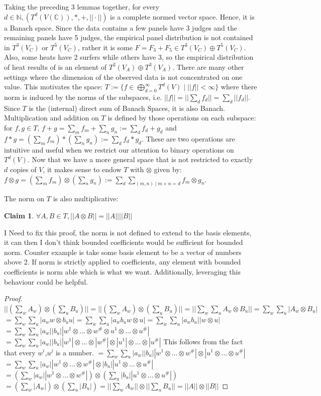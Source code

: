 \documentclass{article}
\newtheorem*{claim}{Claim}
\begin{document}
Taking the preceding 3 lemmas together, for every $d\in\mathbb{N},  (T^d(V(\mathbb{C})), *, +, ||\cdot||)$ is a complete normed vector space. Hence, it is a Banach space. Since the data contains a few panels have 3 judges and the remaining panels have 5 judges, the empirical panel distribution is not contained in $T^3(V_C)$ or $T^5(V_C)$, rather it is some $F = F_3 + F_5 \in T^3(V_C)\oplus T^5(V_C)$. Also, some heats have 2 surfers while others have 3, so the empirical distribution of heat results of is an element of $T^2(V_A)\oplus T^3(V_A)$. There are many other settings where the dimension of the observed data is not concentrated on one value. This motivates the space: $T := \{ f\in\bigoplus_{d=0}^\infty T^d(V) \mid ||f||<\infty \} $ where there norm is induced by the norms of the subspaces, i.e. $||f|| = ||\sum_d f_d|| = \sum_d||f_d||$. Since $T$ is the (internal) direct sum of Banach Spaces, it is also Banach. Multiplication and addition on $T$ is defined by those operations on each subspace: for $f,g \in T$, $f+g = \sum_m f_m + \sum_n g_n :=\sum_d f_d + g_d$ and $f*g = (\sum_m f_m)*(\sum_n g_n) := \sum_d f_d*g_d$. These are two operations are intuitive and useful when we restrict our attention to binary operations on $T^d(V)$. Now that we have a more general space that is not restricted to exactly $d$ copies of $V$, it makes sense to endow $T$ with $\otimes $ given by: $f\otimes g=(\sum_m f_m)\otimes(\sum_n g_n):= \sum_d \sum_{(m,n) \mid m+n =d} f_m \otimes g_n  $.

The norm on $T$ is also multiplicative: 
\begin{claim} $\forall A,B \in T, ||A\otimes B||=||A|| ||B||$  \end{claim}
I Need to fix this proof, the norm is not defined to extend to the basis elements, it can then I don't think bounded coefficients would be sufficient for bounded norm. Counter example is take some basis element to be a vector of numbers above 2. If norm is strictly applied to coefficients, any element with bounded coefficients is norm able which is what we want. Additionally, leveraging this behaviour could be helpful.
\begin{proof} $||(\sum_w A_w)\otimes(\sum_u B_u )||=||(\sum_w A_w)\otimes(\sum_u B_u)||   =||\sum_w\sum_u A_w\otimes B_u || = \sum_w\sum_u |A_w\otimes B_u|$
$ = \sum_w\sum_u |a_w w\otimes b_u u|=\sum_w\sum_u |a_w b_u w\otimes u|= \sum_w\sum_u |a_w b_u||w\otimes u| $
$= \sum_w\sum_u |a_w|| b_u||w^1\otimes\dots\otimes w^\#\otimes u^1\otimes\dots\otimes u^\#|$
$= \sum_w\sum_u |a_w|| b_u||w^1|\otimes\dots\otimes| w^\#|\otimes |u^1|\otimes\dots\otimes |u^\#|$
This follows from the fact that every $w^i$,$u^j$ is a number.
$= \sum_w\sum_u |a_w|| b_u||w^1\otimes\dots\otimes w^\#|\otimes |u^1\otimes\dots\otimes u^\#|$
$= \sum_w\sum_u |a_w||w^1\otimes\dots\otimes w^\#|\otimes | b_u||u^1\otimes\dots\otimes u^\#|$
$= (\sum_w |a_w||w^1\otimes\dots\otimes w^\#|)\otimes (\sum_u| b_u||u^1\otimes\dots\otimes u^\#|)$
$= (\sum_w |A_w|)\otimes(\sum_u |B_u|) = ||\sum_w A_w||\otimes||\sum_u B_u||= ||A||\otimes ||B||$
\end{proof}
\end{document}

